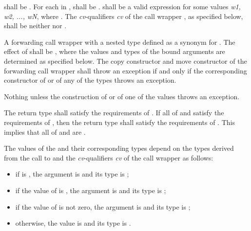 \begin{itemdescr}
\pnum
\requires
{} shall be . For each 
in ,  shall be .
 shall be  a valid
expression for some
values \textit{w1, w2, ..., wN}, where
.
The \textit{cv}-qualifiers \textit{cv} of the call wrapper ,
as specified below, shall be neither  nor .

\pnum
\returns A forwarding call wrapper  with a nested  type
 defined as a synonym for .  The effect of
 shall be , where the values and types of the bound
arguments  are determined as specified below.
The copy constructor and move constructor of the forwarding call wrapper shall throw an
exception if and only if the corresponding constructor of  or of any of the types
 throws an exception.

\pnum
\throws Nothing unless the construction of
 or of one of the values  throws an exception.

\pnum
\notes The return type shall satisfy the requirements of . If all
of  and  satisfy the requirements of , then the
return type shall satisfy the requirements of . \enternote This implies
that all of  and  are . \exitnote
\end{itemdescr}

\pnum
{}%
The values of the   and their
corresponding types  depend on the
types  derived from
the call to  and the
\textit{cv}-qualifiers \textit{cv} of the call wrapper  as follows:

\begin{itemize}
\item if  is , the
argument is  and its type  is ;

\item if the value of 
is , the argument is   and its
type  is
;

\item if the value  of 
is not zero, the  argument is 
and its type 
is ;

\item otherwise, the value is  and its type 
is .
\end{itemize}

